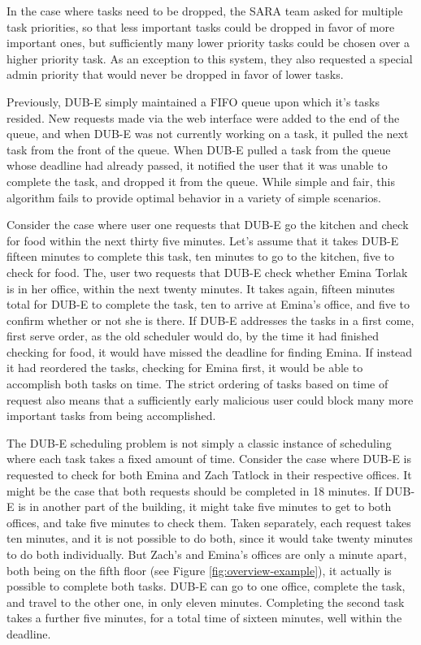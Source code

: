 \documentclass[11pt]{article}
\begin{document}
In the case where tasks need to be dropped,
the SARA team asked for multiple task priorities,
so that less important tasks could be dropped
in favor of more important ones,
but sufficiently many lower priority tasks
could be chosen over a higher priority task.
As an exception to this system,
they also requested a special admin priority
that would never be dropped in favor of lower tasks.

Previously, DUB-E simply maintained a FIFO queue
upon which it's tasks resided.
New requests made via the web interface
were added to the end of the queue,
and when DUB-E was not currently working on a task,
it pulled the next task from the front of the queue.
When DUB-E pulled a task from the queue
whose deadline had already passed,
it notified the user that it was unable to complete the task,
and dropped it from the queue.
While simple and fair,
this algorithm fails to provide
optimal behavior in a variety of simple scenarios.

Consider the case where user one
requests that DUB-E go the kitchen
and check for food
within the next thirty five minutes.
Let's assume that it takes DUB-E fifteen minutes
to complete this task,
ten minutes to go to the kitchen,
five to check for food.
The, user two requests that DUB-E
check whether Emina Torlak is in her office,
within the next twenty minutes.
It takes again, fifteen minutes total
for DUB-E to complete the task,
ten to arrive at Emina's office,
and five to confirm whether or not she is there.
If DUB-E addresses the tasks in a first come, first serve order,
as the old scheduler would do,
by the time it had finished checking for food,
it would have missed the deadline for finding Emina.
If instead it had reordered the tasks,
checking for Emina first,
it would be able to accomplish both tasks on time.
The strict ordering of tasks
based on time of request
also means that a sufficiently early malicious user
could block many more important tasks from being accomplished.

The DUB-E scheduling problem is not simply
a classic instance of scheduling
where each task takes a fixed amount of time.
Consider the case where DUB-E
is requested to check for both Emina and Zach Tatlock
in their respective offices.
It might be the case that both requests
should be completed in 18 minutes.
If DUB-E is in another part of the building,
it might take five minutes to get to both offices,
and take five minutes to check them.
Taken separately, each request takes ten minutes,
and it is not possible to do both,
since it would take twenty minutes to do both individually.
But Zach's and Emina's offices are only a minute apart,
both being on the fifth floor (see Figure \ref{fig:overview-example}),
it actually is possible to complete both tasks.
DUB-E can go to one office, complete the task,
and travel to the other one,
in only eleven minutes.
Completing the second task takes a further five minutes,
for a total time of sixteen minutes,
well within the deadline.
\end{document}
